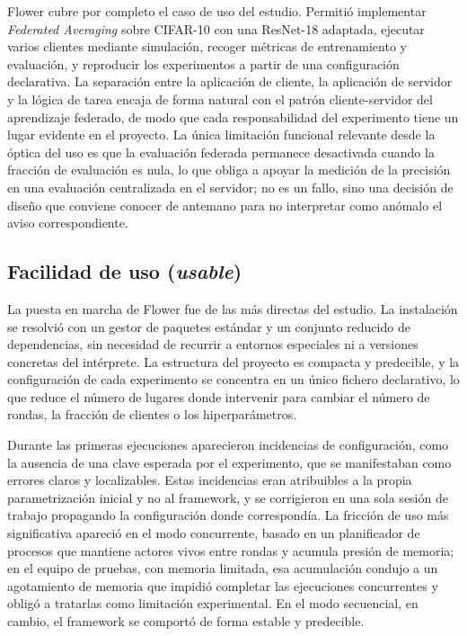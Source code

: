 Flower cubre por completo el caso de uso del estudio. Permitió implementar
\textit{Federated Averaging} sobre CIFAR-10 con una ResNet-18 adaptada, ejecutar varios
clientes mediante simulación, recoger métricas de entrenamiento y evaluación, y reproducir
los experimentos a partir de una configuración declarativa. La separación entre la
aplicación de cliente, la aplicación de servidor y la lógica de tarea encaja de forma
natural con el patrón cliente-servidor del aprendizaje federado, de modo que cada
responsabilidad del experimento tiene un lugar evidente en el proyecto. La única limitación
funcional relevante desde la óptica del uso es que la evaluación federada permanece
desactivada cuando la fracción de evaluación es nula, lo que obliga a apoyar la medición de
la precisión en una evaluación centralizada en el servidor; no es un fallo, sino una
decisión de diseño que conviene conocer de antemano para no interpretar como anómalo el
aviso correspondiente.

\subsection{Facilidad de uso (\textit{usable})}\label{sec:usab-flower-usable}

La puesta en marcha de Flower fue de las más directas del estudio. La instalación se
resolvió con un gestor de paquetes estándar y un conjunto reducido de dependencias, sin
necesidad de recurrir a entornos especiales ni a versiones concretas del intérprete. La
estructura del proyecto es compacta y predecible, y la configuración de cada experimento se
concentra en un único fichero declarativo, lo que reduce el número de lugares donde
intervenir para cambiar el número de rondas, la fracción de clientes o los hiperparámetros.

Durante las primeras ejecuciones aparecieron incidencias de configuración, como la ausencia
de una clave esperada por el experimento, que se manifestaban como errores claros y
localizables. Estas incidencias eran atribuibles a la propia parametrización inicial y no al
framework, y se corrigieron en una sola sesión de trabajo propagando la configuración donde
correspondía. La fricción de uso más significativa apareció en el modo concurrente, basado
en un planificador de procesos que mantiene actores vivos entre rondas y acumula presión de
memoria; en el equipo de pruebas, con memoria limitada, esa acumulación condujo a un agotamiento
de memoria que impidió completar las ejecuciones concurrentes y obligó a tratarlas como
limitación experimental. En el modo secuencial, en cambio, el framework se comportó de forma
estable y predecible.

